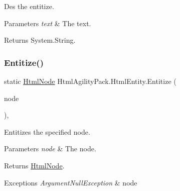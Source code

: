 Des the entitize. 


\begin{DoxyParams}{Parameters}
{\em text} & The text.\\
\hline
\end{DoxyParams}
\begin{DoxyReturn}{Returns}
System.\+String.
\end{DoxyReturn}
\mbox{\label{class_html_agility_pack_1_1_html_entity_ae752bfdce1a048ebfe9bc9a515a7c637}} 
\subsubsection{\texorpdfstring{Entitize()}{Entitize()}\hspace{0.1cm}{\footnotesize\ttfamily [1/4]}}
{\footnotesize\ttfamily static \hyperlink{class_html_agility_pack_1_1_html_node}{Html\+Node} Html\+Agility\+Pack.\+Html\+Entity.\+Entitize (\begin{DoxyParamCaption}\item[{\hyperlink{class_html_agility_pack_1_1_html_node}{Html\+Node}}]{node }\end{DoxyParamCaption})\hspace{0.3cm}{\ttfamily [inline]}, {\ttfamily [static]}}



Entitizes the specified node. 


\begin{DoxyParams}{Parameters}
{\em node} & The node.\\
\hline
\end{DoxyParams}
\begin{DoxyReturn}{Returns}
\hyperlink{class_html_agility_pack_1_1_html_node}{Html\+Node}.
\end{DoxyReturn}

\begin{DoxyExceptions}{Exceptions}
{\em Argument\+Null\+Exception} & node\\
\hline
\end{DoxyExceptions}
\mbox{\label{class_html_agility_pack_1_1_html_entity_ada97762ae6193f45090e133b08d7def4}} 
